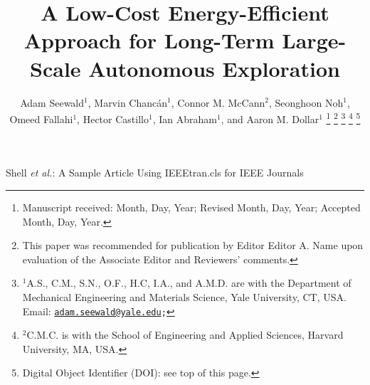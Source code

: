 \documentclass[lettersize,journal]{IEEEtran}
\theoremstyle{definition}
\begin{document}

\title{A Low-Cost Energy-Efficient Approach for Long-Term Large-Scale Autonomous Exploration}%

\author{Adam Seewald${}^\text{1}$, Marvin Chanc{\'a}n${}^\text{1}$, Connor M. McCann${}^\text{2}$, Seonghoon Noh${}^\text{1}$, Omeed Fallahi${}^\text{1}$, Hector Castillo${}^\text{1}$, Ian Abraham${}^\text{1}$, and Aaron M. Dollar${}^\text{1}$%
  \thanks{Manuscript received: Month, Day, Year; Revised Month, Day, Year; Accepted Month, Day, Year.}%
  \thanks{This paper was recommended for publication by Editor Editor A. Name upon evaluation of the Associate Editor and Reviewers' comments.} %
  \thanks{${}^\text{1}$A.\hspace*{.4ex}S., C.\hspace*{.4ex}M., S.\hspace*{.4ex}N., O.\hspace*{.4ex}F., H.\hspace*{.4ex}C, I.\hspace*{.4ex}A., and A.\hspace*{.4ex}M.\hspace*{.4ex}D. are with the Department of Mechanical Engineering and Materials Science, Yale University, CT, USA. Email: {\tt\footnotesize \href{mailto:adam.seewald@yale.edu}{adam.seewald@yale.edu};}}
  \thanks{${}^\text{2}$C.\hspace*{.4ex}M.\hspace*{.4ex}C. is with the School of Engineering and Applied Sciences, Harvard University, MA, USA.}
  \thanks{Digital Object Identifier (DOI): see top of this page.}
}

%
{Shell \MakeLowercase{\textit{et al.}}: A Sample Article Using IEEEtran.cls for IEEE Journals}


\maketitle
\end{document}
